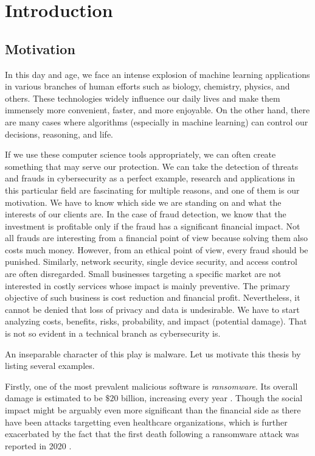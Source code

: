 \chapter{Introduction} \label{chap:intro}
\section*{Motivation}
In this day and age, we face an intense explosion of machine learning applications in various branches of human efforts such as biology, chemistry, physics, and others. These technologies widely influence our daily lives and make them immensely more convenient, faster, and more enjoyable. On the other hand, there are many cases where algorithms (especially in machine learning) can control our decisions, reasoning, and life.

If we use these computer science tools appropriately, we can often create something that may serve our protection. We can take the detection of threats and frauds in cybersecurity as a perfect example, research and applications in this particular field are fascinating for multiple reasons, and one of them is our motivation. We have to know which side we are standing on and what the interests of our clients are. In the case of fraud detection, we know that the investment is profitable only if the fraud has a significant financial impact. Not all frauds are interesting from a financial point of view because solving them also costs much money. However, from an ethical point of view, every fraud should be punished. Similarly, network security, single device security, and access control are often disregarded. Small businesses targeting a specific market are not interested in costly services whose impact is mainly preventive. The primary objective of such business is cost reduction and financial profit. Nevertheless, it cannot be denied that loss of privacy and data is undesirable. We have to start analyzing costs, benefits, risks, probability, and impact (potential damage). That is not so evident in a technical branch as cybersecurity is.

An inseparable character of this play is malware. Let us motivate this thesis by listing several examples.

Firstly, one of the most prevalent malicious software is \emph{ransomware}. Its overall damage is estimated to be $\$20$ billion, increasing every year \cite{purplesec2021}. Though the social impact might be arguably even more significant than the financial side as there have been attacks targetting even healthcare organizations, which is further exacerbated by the fact that the first death following a ransomware attack was reported in 2020 \cite{Cimpanu2020}.


